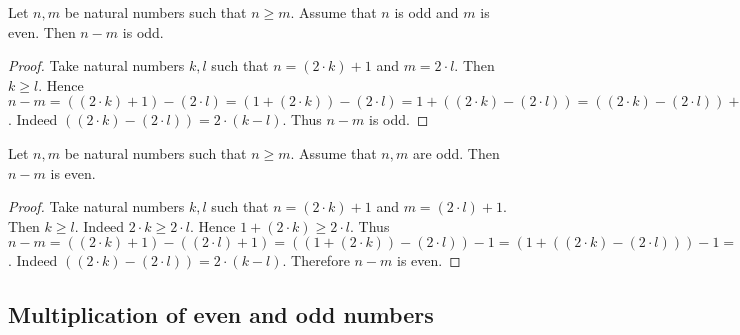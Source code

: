 \documentclass[10pt]{article}
\begin{document}
  \begin{forthel}
    \begin{corollary}
      Let $n, m$ be natural numbers such that $n \geq m$.
      Assume that $n$ is odd and $m$ is even.
      Then $n - m$ is odd.
    \end{corollary}
    \begin{proof}
      Take natural numbers $k, l$ such that $n = (2 \cdot k) + 1$ and $m = 2 \cdot l$.
      Then $k \geq l$.
      Hence $n - m =
      ((2 \cdot k) + 1) - (2 \cdot l) =
      (1 + (2 \cdot k)) - (2 \cdot l) =
      1 + ((2 \cdot k) - (2 \cdot l)) =
      ((2 \cdot k) - (2 \cdot l)) + 1 =
      (2 \cdot (k - l)) + 1$.
      Indeed $((2 \cdot k) - (2 \cdot l)) = 2 \cdot (k - l)$.
      Thus $n - m$ is odd.
    \end{proof}
  \end{forthel}

  \begin{forthel}
    \begin{proposition}
      Let $n, m$ be natural numbers such that $n \geq m$.
      Assume that $n, m$ are odd.
      Then $n - m$ is even.
    \end{proposition}
    \begin{proof}
      Take natural numbers $k, l$ such that $n = (2 \cdot k) + 1$ and $m = (2 \cdot l) + 1$.
      Then $k \geq l$.
      Indeed $2 \cdot k \geq 2 \cdot l$.
      Hence $1 + (2 \cdot k) \geq 2 \cdot l$.
      Thus $n - m =
      ((2 \cdot k) + 1) - ((2 \cdot l) + 1) =
      ((1 + (2 \cdot k)) - (2 \cdot l)) - 1 =
      (1 + ((2 \cdot k) - (2 \cdot l))) - 1 =
      (1 + (2 \cdot (k - l))) - 1 =
      ((2 \cdot (k - l)) + 1) - 1 =
      2 \cdot (k - l)$.
      Indeed $((2 \cdot k) - (2 \cdot l)) = 2 \cdot (k - l)$.
      Therefore $n - m$ is even.
    \end{proof}
  \end{forthel}


  \subsection{Multiplication of even and odd numbers}
\end{document}
